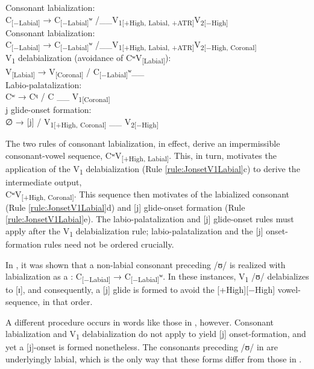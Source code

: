 \documentclass[output=paper,colorlinks,citecolor=brown]{langscibook}
\begin{document}
\ea \label{rule:JonsetV1Labial}
\begin{xlist}
\ex Consonant labialization: \\
    C\textsubscript{[−Labial]} → C\textsubscript{[−Labial]}ʷ /\_\_V\textsubscript{1[+High, Labial, +ATR]}V\textsubscript{2[−High]} \\
   \ex  Consonant labialization: \\
    C\textsubscript{[−Labial]} → C\textsubscript{[−Labial]}ʷ /\_\_V\textsubscript{1[+High, Labial, +ATR]}V\textsubscript{2[−High, Coronal]} \\
   \ex V\textsubscript{1} delabialization (avoidance of CʷV\textsubscript{[Labial]}):\\
   V\textsubscript{[Labial]} → V\textsubscript{[Coronal]} / C\textsubscript{[−Labial]}ʷ\_\_ \\
   \ex Labio-palatalization:\\
   Cʷ →  Cᶣ / C \_\_ V\textsubscript{1[Coronal]}\\ 
   \ex j glide-onset formation: \\
 ∅ → [j] / V\textsubscript{1[+High, Coronal]} \_\_ V\textsubscript{2[−High]} \\
\end{xlist}
\z

The two rules of consonant labialization, in effect, derive an impermissible consonant-vowel sequence, CʷV\textsubscript{[+High, Labial]}. This, in turn, motivates the application of the V\textsubscript{1} delabialization (Rule \ref{rule:JonsetV1Labial}c) to derive the intermediate output,\\
CʷV\textsubscript{[+High, Coronal]}. This sequence then motivates  of the labialized consonant (Rule \ref{rule:JonsetV1Labial}d) and [j] glide-onset formation (Rule \ref{rule:JonsetV1Labial}e). The labio-palatalization and [j] glide-onset rules must apply after the V\textsubscript{1} delabialization rule; labio-palatalization and the [j] onset-formation rules need not be ordered crucially.     

In , it was shown that a non-labial consonant preceding /ʊ/ is realized with labialization as a : C\textsubscript{[−Labial]} → C\textsubscript{[−Labial]}ʷ. In these instances, V\textsubscript{1} /ʊ/ delabializes to [ɪ], and consequently, a [j] glide is formed to avoid the [+High][−High] vowel-sequence, in that order. 

A different procedure occurs in words like those in , however. Consonant labialization and V\textsubscript{1} delabialization do not apply to yield [j] onset-formation, and yet a [j]-onset is formed nonetheless. The consonants preceding /ʊ/ in  are underlyingly labial, which is the only way that these forms differ from those in .   
\end{document}
